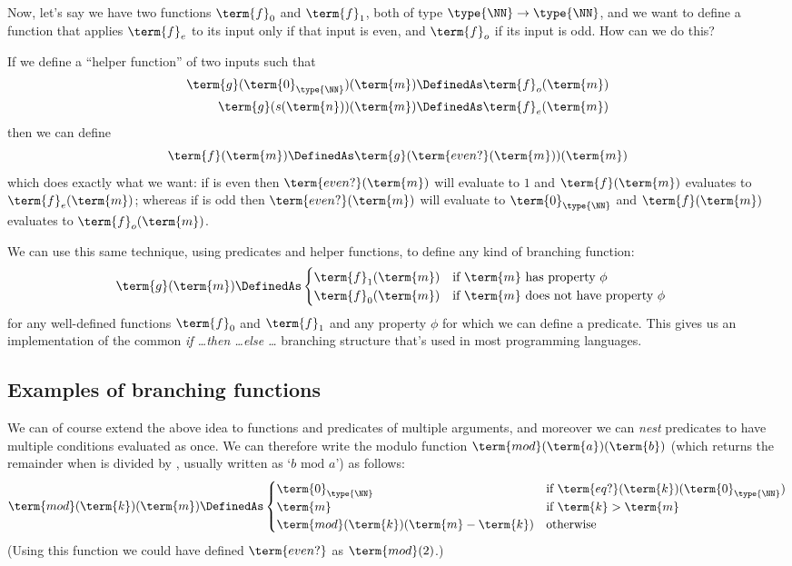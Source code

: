 Now, let's say we have two functions $\term{f}_{0}$ and $\term{f}_{1}$, both of type $\type{\NN} \to \type{\NN}$, and we want to 
define a function that applies $\term{f}_{e}$ to its input only if that input is even, and $\term{f}_{o}$ if its input is odd.  How can we do this?

If we define a ``helper function''  of two inputs such that
\begin{align*}
\term{g}(\term{0}_{\type{\NN}})(\term{m})
&\DefinedAs
\term{f}_{o}(\term{m})
\\
\term{g}(s(\term{n}))(\term{m})
&\DefinedAs
\term{f}_{e}(\term{m})
\end{align*}
then we can define 
\[
\term{f}(\term{m})
\DefinedAs
\term{g}
(\term{even?}(\term{m}))
(\term{m})
\]
which does exactly what we want: 
if  is even then 
$\term{even?}(\term{m})$ will evaluate to $1$ and 
$\term{f}(\term{m})$ evaluates to $\term{f}_{e}(\term{m})$; 
whereas 
if  is odd then 
$\term{even?}(\term{m})$ will evaluate to $\term{0}_{\type{\NN}}$ and 
$\term{f}(\term{m})$ evaluates to $\term{f}_{o}(\term{m})$.

We can use this same technique, using predicates and helper functions, to define any kind of branching function:
\[
\term{g}(\term{m}) \DefinedAs
\begin{cases}
\term{f}_{1}(\term{m}) \quad \mbox{if } \term{m}\mbox{ has property }\phi
\\
\term{f}_{0}(\term{m}) \quad \mbox{if } \term{m}\mbox{ does not have property }\phi
\end{cases}
\]
for any well-defined functions $\term{f}_{0}$ and $\term{f}_{1}$ and any property $\phi$ for which we can define a predicate.  This gives us an implementation of the common \emph{if \ldots then \ldots else \ldots} branching structure that's used in most programming languages.


\subsection{Examples of branching functions}

We can of course extend the above idea to functions and predicates of multiple arguments, and moreover we can \emph{nest} predicates to have multiple conditions evaluated as once.  We can therefore write the modulo function 
$\term{mod}
(\term{a})
(\term{b})$
(which returns the remainder when  is divided by , usually written as `$b \mbox{ mod } a$') as follows:
\[
\term{mod}
(\term{k})
(\term{m}) 
\DefinedAs
\begin{cases}
\term{0}_{\type{\NN}}
	&\mbox{if } \term{eq?}(\term{k})(\term{0}_{\type{\NN}})
\\
\term{m} 
	&\mbox{if } \term{k} > \term{m}
\\
\term{mod}
(\term{k})
(\term{m} - \term{k} )
	&\mbox{otherwise}
\end{cases}
\]
(Using this function we could have defined $\term{even?}$ as $\term{mod}(2)$.)

